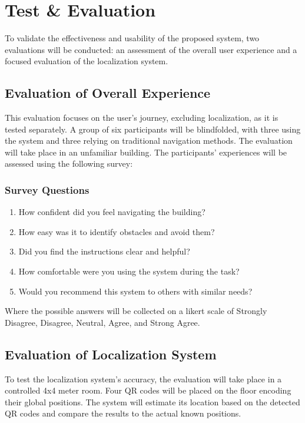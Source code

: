 \section{Test \& Evaluation}

To validate the effectiveness and usability of the proposed system, two evaluations will be conducted: an assessment of the overall user experience and a focused evaluation of the localization system.

\subsection{Evaluation of Overall Experience}

This evaluation focuses on the user's journey, excluding localization, as it is tested separately. A group of six participants will be blindfolded, with three using the system and three relying on traditional navigation methods. The evaluation will take place in an unfamiliar building. The participants’ experiences will be assessed using the following survey:

\subsubsection*{Survey Questions}
\begin{enumerate}
	\item How confident did you feel navigating the building?
	\item How easy was it to identify obstacles and avoid them?
	\item Did you find the instructions clear and helpful?
	\item How comfortable were you using the system during the task?
	\item Would you recommend this system to others with similar needs?
\end{enumerate}

Where the possible answers will be collected on a likert scale of Strongly Disagree, Disagree, Neutral, Agree, and Strong Agree. 


\subsection{Evaluation of Localization System}

To test the localization system's accuracy, the evaluation will take place in a controlled 4x4 meter room. Four QR codes will be placed on the floor encoding their global positions. The system will estimate its location based on the detected QR codes and compare the results to the actual known positions.

